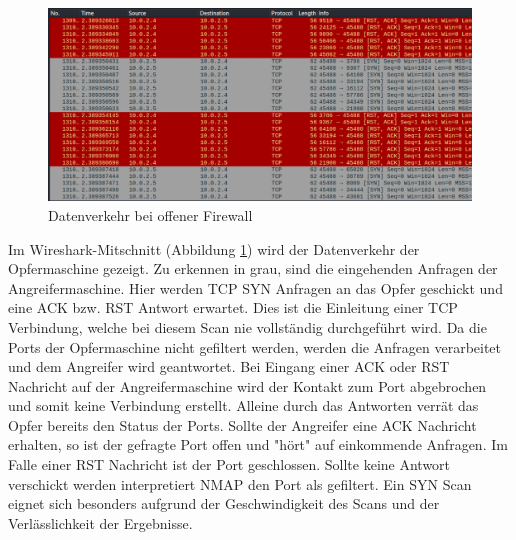 \begin{figure}
	\includegraphics[width=\linewidth]{img/ws_firewall-open.png}
	\caption{Datenverkehr bei offener Firewall}
	\label{fig:ws_firewall_open}
\end{figure}

Im Wireshark-Mitschnitt (Abbildung \ref{fig:ws_firewall_open}) wird der Datenverkehr der Opfermaschine gezeigt. Zu erkennen in grau, sind die eingehenden Anfragen der Angreifermaschine. Hier werden TCP SYN Anfragen an das Opfer geschickt und eine ACK bzw. RST Antwort erwartet. Dies ist die Einleitung einer TCP Verbindung, welche bei diesem Scan nie vollständig durchgeführt wird. Da die Ports der Opfermaschine nicht gefiltert werden, werden die Anfragen verarbeitet und dem Angreifer wird geantwortet. Bei Eingang einer ACK oder RST Nachricht auf der Angreifermaschine wird der Kontakt zum Port abgebrochen und somit keine Verbindung erstellt. Alleine durch das Antworten verrät das Opfer bereits den Status der Ports. Sollte der Angreifer eine ACK Nachricht erhalten, so ist der gefragte Port offen und "hört" auf einkommende Anfragen. Im Falle einer RST Nachricht ist der Port geschlossen.
 Sollte keine Antwort verschickt werden interpretiert NMAP den Port als gefiltert. Ein SYN Scan eignet sich besonders aufgrund der Geschwindigkeit des Scans und der Verlässlichkeit der Ergebnisse.

